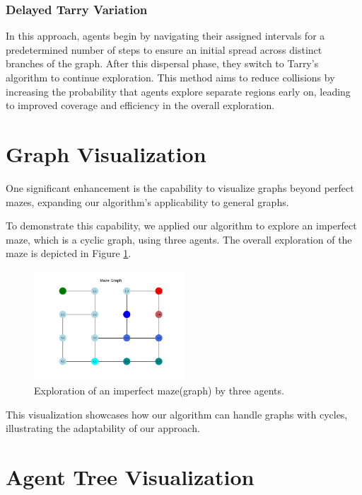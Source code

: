 \subsubsection{Delayed Tarry Variation}

In this approach, agents begin by navigating their assigned intervals for a predetermined number of steps to ensure an initial spread across distinct branches of the graph. After this dispersal phase, they switch to Tarry's algorithm to continue exploration. This method aims to reduce collisions by increasing the probability that agents explore separate regions early on, leading to improved coverage and efficiency in the overall exploration.

\section{Graph Visualization}
\label{section_method_graph_visualization}

One significant enhancement is the capability to visualize graphs
beyond perfect mazes, expanding our algorithm's applicability to general graphs.

To demonstrate this capability, we applied our algorithm to explore
an imperfect maze, which is a cyclic graph, using three agents. The overall exploration of the maze is depicted in Figure \ref{fig_imperfect_maze_exploration}.

\begin{figure}[H]
\centering
\includegraphics[width=0.5\textwidth]{Cap2/maze_imperfect_exploration.png}
\caption{Exploration of an imperfect maze(graph) by three agents.}
\label{fig_imperfect_maze_exploration}
\end{figure}

This visualization showcases how our algorithm can handle graphs
with cycles, illustrating the adaptability of our approach.

\section{Agent Tree Visualization}
\label{section_method_tree_visualization}

